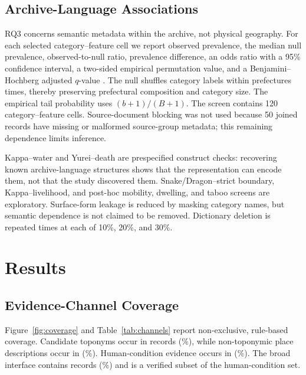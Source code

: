 \documentclass[9pt,twocolumn,a4paper]{extarticle}
\begin{document}
\subsection{Archive-Language Associations}

RQ3 concerns semantic metadata within the archive, not physical geography. For each selected category--feature cell we report observed prevalence, the median null prevalence, observed-to-null ratio, prevalence difference, an odds ratio with a 95\% confidence interval, a two-sided empirical permutation value, and a Benjamini--Hochberg adjusted \(q\)-value \citep{benjamini1995}. The null shuffles category labels within prefectures \PermutationCount{} times, thereby preserving prefectural composition and category size. The empirical tail probability uses \((b+1)/(B+1)\). The screen contains 120 category--feature cells. Source-document blocking was not used because 50 joined records have missing or malformed source-group metadata; this remaining dependence limits inference.

Kappa--water and Yurei--death are prespecified construct checks: recovering known archive-language structures shows that the representation can encode them, not that the study discovered them. Snake/Dragon--strict boundary, Kappa--livelihood, and post-hoc mobility, dwelling, and taboo screens are exploratory. Surface-form leakage is reduced by masking category names, but semantic dependence is not claimed to be removed. Dictionary deletion is repeated \RobustnessReplicates{} times at each of 10\%, 20\%, and 30\%.

\section{Results}

\subsection{Evidence-Channel Coverage}

Figure~\ref{fig:coverage} and Table~\ref{tab:channels} report non-exclusive, rule-based coverage. Candidate toponyms occur in \CandidateToponymCount{} records (\CandidateToponymPercent\%), while non-toponymic place descriptions occur in \PlaceDescriptionCount{} (\PlaceDescriptionPercent\%). Human-condition evidence occurs in \HumanConditionCount{} (\HumanConditionPercent\%). The broad interface contains \BroadInterfaceCount{} records (\BroadInterfacePercent\%) and is a verified subset of the human-condition set.
\end{document}
